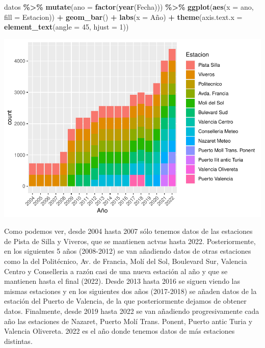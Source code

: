 \documentclass[notspecified,article,submit,moreauthors,pdftex]{Definitions/mdpi}
\newenvironment{Shaded}{\begin{snugshade}}{\end{snugshade}}
\newcommand{\AttributeTok}[1]{\textcolor[rgb]{0.13,0.29,0.53}{#1}}
\newcommand{\DecValTok}[1]{\textcolor[rgb]{0.00,0.00,0.81}{#1}}
\newcommand{\FunctionTok}[1]{\textcolor[rgb]{0.13,0.29,0.53}{\textbf{#1}}}
\newcommand{\NormalTok}[1]{#1}
\newcommand{\SpecialCharTok}[1]{\textcolor[rgb]{0.81,0.36,0.00}{\textbf{#1}}}
\newcommand{\StringTok}[1]{\textcolor[rgb]{0.31,0.60,0.02}{#1}}
\begin{document}
\begin{Shaded}
\begin{Highlighting}[]
\NormalTok{datos }\SpecialCharTok{\%\textgreater{}\%}
  \FunctionTok{mutate}\NormalTok{(}\AttributeTok{ano =} \FunctionTok{factor}\NormalTok{(}\FunctionTok{year}\NormalTok{(Fecha))) }\SpecialCharTok{\%\textgreater{}\%}
  \FunctionTok{ggplot}\NormalTok{(}\FunctionTok{aes}\NormalTok{(}\AttributeTok{x =}\NormalTok{ ano, }\AttributeTok{fill =}\NormalTok{ Estacion)) }\SpecialCharTok{+}
  \FunctionTok{geom\_bar}\NormalTok{() }\SpecialCharTok{+}
  \FunctionTok{labs}\NormalTok{(}\AttributeTok{x =} \StringTok{\textquotesingle{}Año\textquotesingle{}}\NormalTok{) }\SpecialCharTok{+}
  \FunctionTok{theme}\NormalTok{(}\AttributeTok{axis.text.x =} \FunctionTok{element\_text}\NormalTok{(}\AttributeTok{angle =} \DecValTok{45}\NormalTok{, }\AttributeTok{hjust =} \DecValTok{1}\NormalTok{))}
\end{Highlighting}
\end{Shaded}

\includegraphics{Memoria_files/figure-latex/unnamed-chunk-11-1.pdf}

Como podemos ver, desde 2004 hasta 2007 sólo tenemos datos de las
estaciones de Pista de Silla y Viveros, que se mantienen actvas hasta
2022. Posteriormente, en los siguientes 5 años (2008-2012) se van
añadiendo datos de otras estaciones como la del Politécnico, Av. de
Francia, Molí del Sol, Boulevard Sur, Valencia Centro y Conselleria a
razón casi de una nueva estación al año y que se mantienen hasta el
final (2022). Desde 2013 hasta 2016 se siguen viendo las mismas
estaciones y en los siguientes dos años (2017-2018) se añaden datos de
la estación del Puerto de Valencia, de la que posteriormente dejamos de
obtener datos. Finalmente, desde 2019 hasta 2022 se van añadiendo
progresivamente cada año las estaciones de Nazaret, Puerto Molí Trans.
Ponent, Puerto antic Turia y Valencia Olivereta. 2022 es el año donde
tenemos datos de más estaciones distintas.
\end{document}
